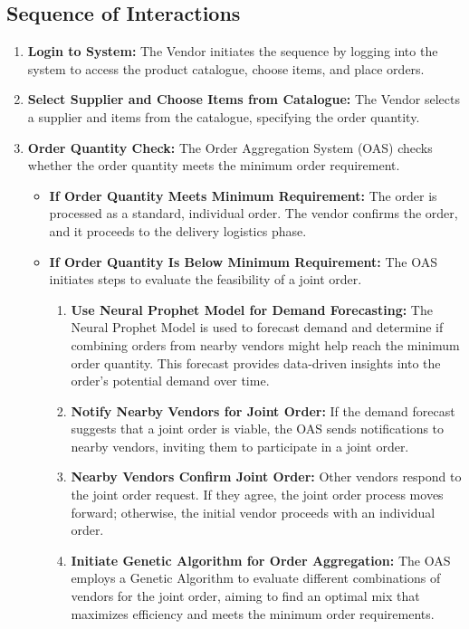 \subsection{Sequence of Interactions}

\begin{enumerate}
    \item \textbf{Login to System:} The Vendor initiates the sequence by logging into the system to access the product catalogue, choose items, and place orders.
    \item \textbf{Select Supplier and Choose Items from Catalogue:} The Vendor selects a supplier and items from the catalogue, specifying the order quantity.
    \item \textbf{Order Quantity Check:} The Order Aggregation System (OAS) checks whether the order quantity meets the minimum order requirement.
          \begin{itemize}
              \item \textbf{If Order Quantity Meets Minimum Requirement:} The order is processed as a standard, individual order. The vendor confirms the order, and it proceeds to the delivery logistics phase.
              \item \textbf{If Order Quantity Is Below Minimum Requirement:} The OAS initiates steps to evaluate the feasibility of a joint order.
                    \begin{enumerate}
                        \item \textbf{Use Neural Prophet Model for Demand Forecasting:} The Neural Prophet Model is used to forecast demand and determine if combining orders from nearby vendors might help reach the minimum order quantity. This forecast provides data-driven insights into the order’s potential demand over time.
                        \item \textbf{Notify Nearby Vendors for Joint Order:} If the demand forecast suggests that a joint order is viable, the OAS sends notifications to nearby vendors, inviting them to participate in a joint order.
                        \item \textbf{Nearby Vendors Confirm Joint Order:} Other vendors respond to the joint order request. If they agree, the joint order process moves forward; otherwise, the initial vendor proceeds with an individual order.
                        \item \textbf{Initiate Genetic Algorithm for Order Aggregation:} The OAS employs a Genetic Algorithm to evaluate different combinations of vendors for the joint order, aiming to find an optimal mix that maximizes efficiency and meets the minimum order requirements.

\end{enumerate}
\end{itemize}
\end{enumerate}
